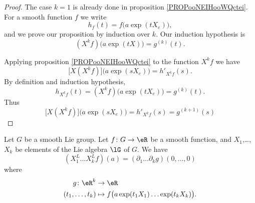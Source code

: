 \begin{proof}
	The case \( k=1\) is already done in proposition \ref{PROPooNEIHooWQctei}. For a smooth function \( f\) we write
	\begin{equation}
		h_f(t)=f\big( a\exp(tX_e) \big),
	\end{equation}
	and we prove our proposition by induction over \( k\). Our induction hypothesis is
	\begin{equation}
		(X^kf)\big( a\exp(tX) \big)=g^{(k)}(t).
	\end{equation}

	Applying proposition \ref{PROPooNEIHooWQctei} to the function \( X^kf\) we have
	\begin{equation}
		\big[ X(X^kf) \big]\big( a\exp(sX_e) \big)=h'_{X^kf}(s).
	\end{equation}
	By definition and induction hypothesis,
	\begin{equation}
		h_{X^kf}(t)=(X^kf)\big( a\exp(tX_e) \big)=g^{(k)}(t).
	\end{equation}
	Thus
	\begin{equation}
		\big[ X(X^kf) \big]\big( a\exp(sX_e) \big)=h'_{X^kf}(s)=g^{(k+1)}(s)
	\end{equation}
\end{proof}

\begin{proposition}	\label{PROPooXCMUooJqsTvB}
	Let \( G\) be a smooth Lie group. Let \(f \colon G\to \eR  \) be a smooth function, and \( X_1\),\ldots, \( X_k\) be elements of the Lie algebra \( \lG\) of \( G\). We have
	\begin{equation}
		(X_1^L\ldots X_k^Lf)(a)=(\partial_1\ldots\partial_kg)(0,\ldots,0)
	\end{equation}
	where
	\begin{equation}
		\begin{aligned}
			g\colon \eR^k    & \to \eR                                                \\
			(t_1,\ldots,t_k) & \mapsto f\big( a\exp(t_1X_1)\ldots \exp(t_kX_k) \big).
		\end{aligned}
	\end{equation}
\end{proposition}

